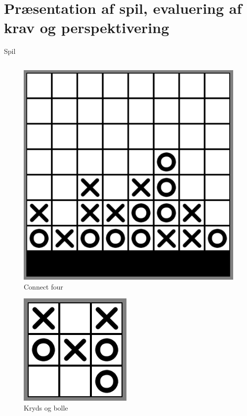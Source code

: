 \section{Præsentation af spil, evaluering af krav og perspektivering}

\begin{frame}{Spil}
\begin{columns}
	\begin{column}{.49\textwidth}
	\centering
		\begin{figure}[H]
   			\includegraphics[scale=0.18]{billeder/connect4.png}
   			\caption{Connect four}
		\end{figure}
	\hspace{0.3cm}
	\centering
		\begin{figure}[H]
   			\includegraphics[scale=0.28]{billeder/noughtncrosses.png}
   			\caption{Kryds og bolle}
		\end{figure}

\end{column}
\end{columns}
\end{frame}
